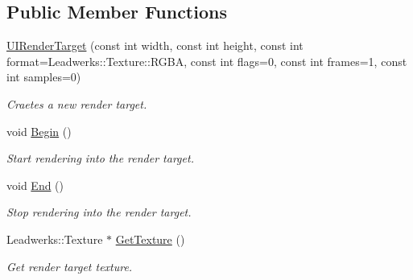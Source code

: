 \subsection*{Public Member Functions}
\begin{DoxyCompactItemize}
\item 
\hyperlink{class_u_i_render_target_a0a92fb5e803c91ca4288b4244ab6af3b}{U\-I\-Render\-Target} (const int width, const int height, const int format=Leadwerks\-::\-Texture\-::\-R\-G\-B\-A, const int flags=0, const int frames=1, const int samples=0)
\begin{DoxyCompactList}\small\item\em Craetes a new render target. \end{DoxyCompactList}\item 
\hypertarget{class_u_i_render_target_a647cc3a9d76dca037954d2c694dc8499}{void \hyperlink{class_u_i_render_target_a647cc3a9d76dca037954d2c694dc8499}{Begin} ()}\label{class_u_i_render_target_a647cc3a9d76dca037954d2c694dc8499}

\begin{DoxyCompactList}\small\item\em Start rendering into the render target. \end{DoxyCompactList}\item 
\hypertarget{class_u_i_render_target_ab660bf14c0e070939943076825e859cb}{void \hyperlink{class_u_i_render_target_ab660bf14c0e070939943076825e859cb}{End} ()}\label{class_u_i_render_target_ab660bf14c0e070939943076825e859cb}

\begin{DoxyCompactList}\small\item\em Stop rendering into the render target. \end{DoxyCompactList}\item 
Leadwerks\-::\-Texture $\ast$ \hyperlink{class_u_i_render_target_a6ede8013f6b4c87556c37f086f1a864d}{Get\-Texture} ()
\begin{DoxyCompactList}\small\item\em Get render target texture. \end{DoxyCompactList}\end{DoxyCompactItemize}
